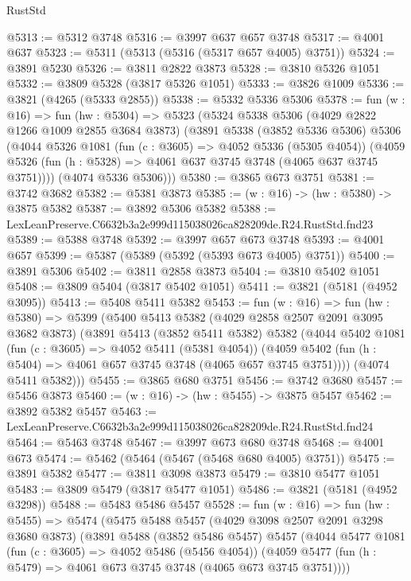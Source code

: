 \begin{lexlean}{RustStd}
\begin{coremodule}
@5313 := @5312 @3748
@5316 := @3997 @637 @657 @3748
@5317 := @4001 @637
@5323 := @5311 (@5313 (@5316 (@5317 @657 @4005) @3751))
@5324 := @3891 @5230
@5326 := @3811 @2822 @3873
@5328 := @3810 @5326 @1051
@5332 := @3809 @5328 (@3817 @5326 @1051)
@5333 := @3826 @1009
@5336 := @3821 (@4265 (@5333 @2855))
@5338 := @5332 @5336 @5306
@5378 := fun (w : @16) =>
  fun (hw : @5304) =>
  @5323
    (@5324
      @5338
      @5306
      (@4029 @2822 @1266 @1009 @2855 @3684 @3873)
      (@3891
        @5338
        (@3852 @5336 @5306)
        @5306
        (@4044
          @5326
          @1081
          (fun (c : @3605) => @4052 @5336 (@5305 @4054))
          (@4059 @5326 (fun (h : @5328) => @4061 @637 @3745 @3748 (@4065 @637 @3745 @3751))))
        (@4074 @5336 @5306)))
@5380 := @3865 @673 @3751
@5381 := @3742 @3682
@5382 := @5381 @3873
@5385 := (w : @16) -> (hw : @5380) -> @3875 @5382
@5387 := @3892 @5306 @5382
@5388 := LexLeanPreserve.C6632b3a2e999d115038026ca828209de.R24.RustStd.fnd23
@5389 := @5388 @3748
@5392 := @3997 @657 @673 @3748
@5393 := @4001 @657
@5399 := @5387 (@5389 (@5392 (@5393 @673 @4005) @3751))
@5400 := @3891 @5306
@5402 := @3811 @2858 @3873
@5404 := @3810 @5402 @1051
@5408 := @3809 @5404 (@3817 @5402 @1051)
@5411 := @3821 (@5181 (@4952 @3095))
@5413 := @5408 @5411 @5382
@5453 := fun (w : @16) =>
  fun (hw : @5380) =>
  @5399
    (@5400
      @5413
      @5382
      (@4029 @2858 @2507 @2091 @3095 @3682 @3873)
      (@3891
        @5413
        (@3852 @5411 @5382)
        @5382
        (@4044
          @5402
          @1081
          (fun (c : @3605) => @4052 @5411 (@5381 @4054))
          (@4059 @5402 (fun (h : @5404) => @4061 @657 @3745 @3748 (@4065 @657 @3745 @3751))))
        (@4074 @5411 @5382)))
@5455 := @3865 @680 @3751
@5456 := @3742 @3680
@5457 := @5456 @3873
@5460 := (w : @16) -> (hw : @5455) -> @3875 @5457
@5462 := @3892 @5382 @5457
@5463 := LexLeanPreserve.C6632b3a2e999d115038026ca828209de.R24.RustStd.fnd24
@5464 := @5463 @3748
@5467 := @3997 @673 @680 @3748
@5468 := @4001 @673
@5474 := @5462 (@5464 (@5467 (@5468 @680 @4005) @3751))
@5475 := @3891 @5382
@5477 := @3811 @3098 @3873
@5479 := @3810 @5477 @1051
@5483 := @3809 @5479 (@3817 @5477 @1051)
@5486 := @3821 (@5181 (@4952 @3298))
@5488 := @5483 @5486 @5457
@5528 := fun (w : @16) =>
  fun (hw : @5455) =>
  @5474
    (@5475
      @5488
      @5457
      (@4029 @3098 @2507 @2091 @3298 @3680 @3873)
      (@3891
        @5488
        (@3852 @5486 @5457)
        @5457
        (@4044
          @5477
          @1081
          (fun (c : @3605) => @4052 @5486 (@5456 @4054))
          (@4059 @5477 (fun (h : @5479) => @4061 @673 @3745 @3748 (@4065 @673 @3745 @3751))))

\end{coremodule}
\end{lexlean}
